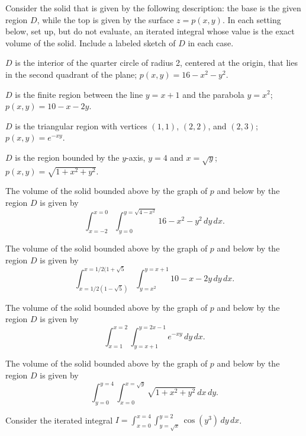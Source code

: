 \begin{exercises}
\begin{exerciseSolution}
\ea
\end{exerciseSolution}

\item Consider the solid that is given by the following description:  the base is the given region $D$, while the top is given by the surface $z = p(x,y)$.  In each setting below, set up, but do not evaluate, an iterated integral whose value is the exact volume of the solid.  Include a labeled sketch of $D$ in each case.

\ba
	\item $D$ is the interior of the quarter circle of radius 2, centered at the origin, that lies in the second quadrant of the plane; $p(x,y) = 16-x^2-y^2$.
	\item $D$ is the finite region between the line $y = x + 1$ and the parabola $y = x^2$; \\ $p(x,y) = 10-x-2y$.
	\item $D$ is the triangular region with vertices $(1,1)$, $(2,2)$, and $(2,3)$; $p(x,y) = e^{-xy}$.
	\item $D$ is the region bounded by the $y$-axis, $y = 4$ and $x = \sqrt{y}$; $p(x,y) = \sqrt{1 + x^2 + y^2}$.
\ea

\begin{exerciseSolution}
\ba
	\item The volume of the solid bounded above by the graph of $p$ and below by the region $D$ is given by 
\[\int_{x=-2}^{x=0} \int_{y=0}^{y=\sqrt{4-x^2}} 16-x^2-y^2 \, dy \, dx.\]

	\item The volume of the solid bounded above by the graph of $p$ and below by the region $D$ is given by 
\[\int_{x=1/2(1-\sqrt{5})}^{x=1/2(1+\sqrt{5}} \int_{y=x^2}^{y=x+1} 10-x-2y \, dy \, dx.\]

	\item The volume of the solid bounded above by the graph of $p$ and below by the region $D$ is given by 
\[\int_{x=1}^{x=2} \int_{y=x+1}^{y=2x-1} e^{-xy} \, dy \, dx.\]

	\item The volume of the solid bounded above by the graph of $p$ and below by the region $D$ is given by 
\[\int_{y=0}^{y=4} \int_{x=0}^{x=\sqrt{y}} \sqrt{1 + x^2 + y^2} \, dx \, dy.\]

\ea
\end{exerciseSolution}

\item Consider the iterated integral $\displaystyle I = \int_{x=0}^{x=4} \int_{y=\sqrt{x}}^{y=2} \cos(y^3) \, dy \, dx$.
   

\end{exercises}

